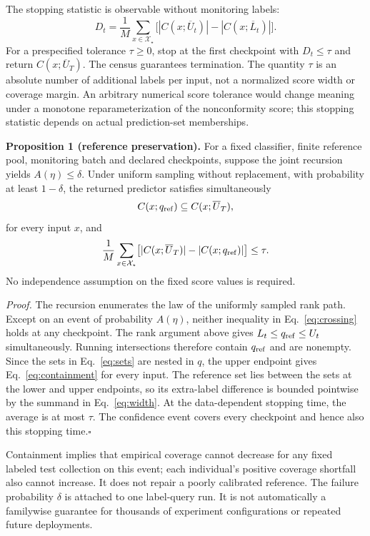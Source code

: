 \documentclass[pdflatex,sn-basic,Numbered,iicol]{sn-jnl}
\begin{document}
The stopping statistic is observable without monitoring labels:
\begin{equation}
 D_t=\frac1M\sum_{x\in\mathcal X_\star}
 \bigl[|C(x;\overline U_t)|-|C(x;\overline L_t)|\bigr].
 \label{eq:width}
\end{equation}
For a prespecified tolerance $\tau\ge0$, stop at the first checkpoint with $D_t\le\tau$ and return $C(x;\overline U_T)$. The census guarantees termination. The quantity $\tau$ is an absolute number of additional labels per input, not a normalized score width or coverage margin. An arbitrary numerical score tolerance would change meaning under a monotone reparameterization of the nonconformity score; this stopping statistic depends on actual prediction-set memberships.

\textbf{Proposition 1 (reference preservation).}
For a fixed classifier, finite reference pool, monitoring batch and declared checkpoints, suppose the joint recursion yields $A(\eta)\le\delta$. Under uniform sampling without replacement, with probability at least $1-\delta$, the returned predictor satisfies simultaneously
\begin{equation}
 C(x;q_{\rm ref})\subseteq C(x;\overline U_T),
 \label{eq:containment}
\end{equation}
for every input $x$, and
\begin{equation}
 \frac1M\sum_{x\in\mathcal X_\star}
 \bigl[|C(x;\overline U_T)|-|C(x;q_{\rm ref})|\bigr]
 \le\tau.
 \label{eq:inflation}
\end{equation}
No independence assumption on the fixed score values is required.

\textit{Proof.} The recursion enumerates the law of the uniformly sampled rank path. Except on an event of probability $A(\eta)$, neither inequality in Eq.~\eqref{eq:crossing} holds at any checkpoint. The rank argument above gives $L_t\le q_{\rm ref}\le U_t$ simultaneously. Running intersections therefore contain $q_{\rm ref}$ and are nonempty. Since the sets in Eq.~\eqref{eq:sets} are nested in $q$, the upper endpoint gives Eq.~\eqref{eq:containment} for every input. The reference set lies between the sets at the lower and upper endpoints, so its extra-label difference is bounded pointwise by the summand in Eq.~\eqref{eq:width}. At the data-dependent stopping time, the average is at most $\tau$. The confidence event covers every checkpoint and hence also this stopping time.\hfill$\square$

Containment implies that empirical coverage cannot decrease for any fixed labeled test collection on this event; each individual's positive coverage shortfall also cannot increase. It does not repair a poorly calibrated reference. The failure probability $\delta$ is attached to one label-query run. It is not automatically a familywise guarantee for thousands of experiment configurations or repeated future deployments.
\end{document}
